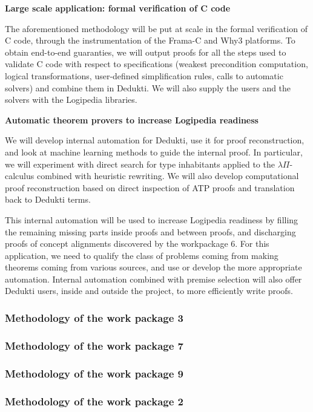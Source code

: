 {\bf \large Large scale application: formal verification of C code}

The aforementioned methodology will be put at scale in the formal
verification of C code, through the instrumentation of the Frama-C and
Why3 platforms. To obtain end-to-end guaranties, we will output proofs
for all the steps used to validate C code with respect to specifications
(weakest precondition computation, logical transformations, user-defined
simplification rules, calls to automatic solvers) and combine them in
Dedukti. We will also supply the users and the solvers with the
Logipedia libraries.


{\bf \large Automatic theorem provers to increase Logipedia readiness}

We will develop internal automation for Dedukti, use it for proof
reconstruction, and look at machine learning methods to guide the
internal proof. In particular, we will experiment with direct search for
type inhabitants applied to the $\lambda\Pi$-calculus combined with
heuristic rewriting. We will also develop computational proof
reconstruction based on direct inspection of ATP proofs and translation
back to Dedukti terms.

This internal automation will be used to increase Logipedia readiness by
filling the remaining missing parts inside proofs and between proofs,
and discharging proofs of concept alignments discovered by the
workpackage 6. For this application, we need to qualify the class of
problems coming from making theorems coming from various sources, and
use or develop the more appropriate automation. Internal automation
combined with premise selection will also offer Dedukti users, inside
and outside the project, to more efficiently write proofs.


\subsubsection{Methodology of the work package 3}

\subsubsection{Methodology of the work package 7}

\subsubsection{Methodology of the work package 9}

\subsubsection{Methodology of the work package 2}

